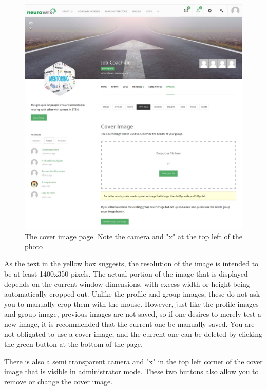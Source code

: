 \documentclass[10pt]{article}
\begin{document}
\begin{figure}[H]
    \centering
    \includegraphics[scale=0.2]{images/groupcoverimage.jpg}
    \caption{The cover image page. Note the camera and "x" at the top left of the photo}
    \label{groupcoverimage}
\end{figure}

\begin{flushleft}
As the text in the yellow box suggests, the resolution of the image is intended to be at least 1400x350 pixels.  The actual portion of the image that is displayed depends on the current window dimensions, with excess width or height being automatically cropped out.  Unlike the profile and group images, these do not ask you to manually crop them with the mouse.  However, just like the profile images and group image, previous images are not saved, so if one desires to merely test a new image, it is recommended that the current one be manually saved.  You are not obligated to use a cover image, and the current one can be deleted by clicking the green button at the bottom of the page. 
\end{flushleft}

\begin{flushleft}
There is also a semi transparent camera and "x" in the top left corner of the cover image that is visible in administrator mode.  These two buttons also allow you to remove or change the cover image.
\end{flushleft}
\end{document}
